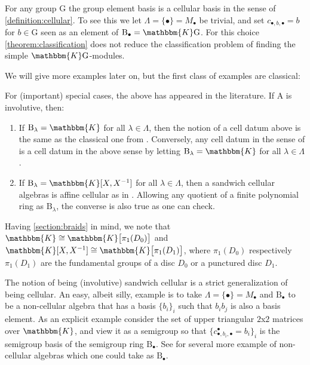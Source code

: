 \documentclass[a4paper,11pt]{amsart}
\newcommand{\setstuff}[1]{\mathrm{#1}}
\newcommand{\KK}{\mathbbm{K}}
\numberwithin{equation}{section}
\let\fullref\autoref
\begin{document}
\begin{example}\label{example:groups}
For any group $\setstuff{G}$ the group element basis 
is a cellular basis in the sense of \fullref{definition:cellular}. 
To see this we let $\Lambda=\{\bullet\}=M_{\bullet}$ be trivial,
and set $c_{\bullet,b,\bullet}=b$ for $b\in\setstuff{G}$
seen as an element of $\setstuff{B}_{\bullet}=\KK\setstuff{G}$.
For this choice \fullref{theorem:classification} 
does not reduce the classification 
problem of finding the simple $\KK\setstuff{G}$-modules.
\end{example}

We will give more examples later on, but
the first class of examples are classical:

\begin{example}
For (important) special cases, the above has appeared in the literature. 
If $\setstuff{A}$ is involutive, then:
\begin{enumerate}

\item If $\setstuff{B}_{\lambda}=\KK$ for all $\lambda\in\Lambda$, 
then the notion of a cell datum above is the same as 
the classical one from \cite{GrLe-cellular}. Conversely, any cell datum in 
the sense of \cite{GrLe-cellular} is a cell datum in the above sense 
by letting $\setstuff{B}_{\lambda}=\KK$ for all $\lambda\in\Lambda$.

\item If $\setstuff{B}_{\lambda}=\KK[X,X^{-1}]$ 
for all $\lambda\in\Lambda$, 
then a sandwich cellular algebras is affine cellular 
as in \cite{KoXi-affine-cellular}. Allowing 
any quotient of a finite polynomial ring as $\setstuff{B}_{\lambda}$, 
the converse is also true as one can check.

\end{enumerate}
\end{example}

\begin{remark}
Having \fullref{section:braids} in mind,
we note that $\KK\cong\KK\big[\pi_{1}(D_{0})\big]$ 
and $\KK[X,X^{-1}]\cong\KK\big[\pi_{1}(D_{1})\big]$,
where $\pi_{1}(D_{0})$ respectively $\pi_{1}(D_{1})$
are the fundamental groups of a disc 
$D_{0}$ or a punctured disc $D_{1}$.
\end{remark}

\begin{example}
The notion of being (involutive) sandwich cellular 
is a strict generalization of 
being cellular. An easy, albeit silly, example is to take 
$\Lambda=\{\bullet\}=M_{\bullet}$ and $\setstuff{B}_{\bullet}$
to be a non-cellular algebra
that has a basis $\{b_{i}\}_{i}$ such that $b_{i}b_{j}$ is 
also a basis element. As an explicit example 
consider the set of upper triangular 
$2$x$2$ matrices over $\KK$, and view it as a semigroup 
so that $\{c_{\bullet,b_{i},\bullet}^{\bullet}=b_{i}\}_{i}$ 
is the semigroup basis of the semigroup ring 
$\setstuff{B}_{\bullet}$.
See \cite{EhTu-relcell} for several more example of non-cellular algebras
which one could take as $\setstuff{B}_{\bullet}$.
\end{example}
\end{document}
